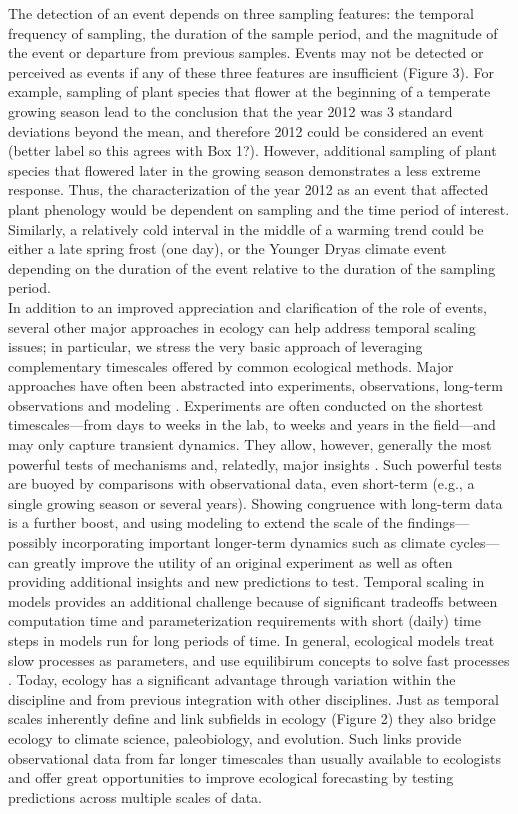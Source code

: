 \documentclass[11pt,a4paper,oneside]{article}
\begin{document}
The detection of an event depends on three sampling features: the temporal frequency of sampling, the duration of the sample period, and the magnitude of the event or departure from previous samples. Events may not be detected or perceived as events if any of these three features are insufficient (Figure 3). For example, sampling of plant species that flower at the beginning of a temperate growing season lead to the conclusion that the year 2012 was 3 standard deviations beyond the mean, and therefore 2012 could be considered an event (better label so this agrees with Box 1?). However, additional sampling of plant species that flowered later in the growing season demonstrates a less extreme response. Thus, the characterization of the year 2012 as an event that affected plant phenology would be dependent on sampling and the time period of interest. Similarly, a relatively cold interval in the middle of a warming trend could be either a late spring frost (one day), or the Younger Dryas climate event \citep{Jackson:2009el} depending on the duration of the event relative to the duration of the sampling period. \\

In addition to an improved appreciation and clarification of the role of events, several other major approaches in ecology can help address temporal scaling issues; in particular, we stress the very basic approach of leveraging complementary timescales offered by common ecological methods. Major approaches have often been abstracted into experiments, observations, long-term observations and modeling \citep{Carpenter:1992hk}. Experiments are often conducted on the shortest timescales---from days to weeks in the lab, to weeks and years in the field---and may only capture transient dynamics. They allow, however, generally the most powerful tests of mechanisms and, relatedly, major insights \citep{Chapin:1995af,Wolkovich:2012n,Laube2014}. Such powerful tests are buoyed by comparisons with observational data, even short-term (e.g., a single growing season or several years). Showing congruence with long-term data is a further boost, and using modeling to extend the scale of the findings---possibly incorporating important longer-term dynamics such as climate cycles---can greatly improve the utility of an original experiment as well as often providing additional insights and new predictions to test. Temporal scaling in models provides an additional challenge because of significant tradeoffs between computation time and parameterization requirements with short (daily) time steps in models run for long periods of time. In general, ecological models treat slow processes as parameters, and use equilibirum concepts to solve fast processes \citep{Carpenter2000}. Today, ecology has a significant advantage through variation within the discipline and from previous integration with other disciplines. Just as temporal scales inherently define and link subfields in ecology (Figure 2) they also bridge ecology to climate science, paleobiology, and evolution. Such links provide observational data from far longer timescales than usually available to ecologists and offer great opportunities to improve ecological forecasting by testing predictions across multiple scales of data. \\
\end{document}
